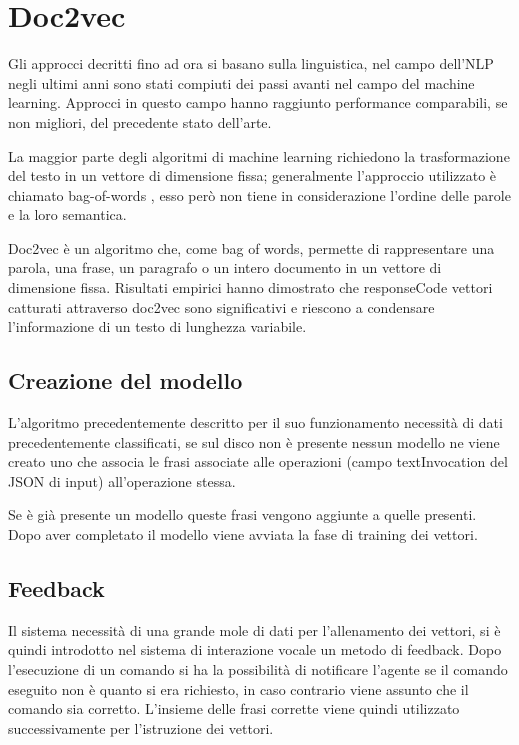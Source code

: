 \documentclass[twoside]{supsistudent}
\begin{document}
\section{Doc2vec}
Gli approcci decritti fino ad ora si basano sulla linguistica, nel campo dell'NLP negli ultimi anni sono stati compiuti dei passi avanti nel campo del machine learning. Approcci in questo campo hanno raggiunto performance comparabili, se non migliori, del precedente stato dell'arte. 

La maggior parte degli algoritmi di machine learning richiedono la trasformazione del testo in un vettore di dimensione fissa; generalmente l'approccio utilizzato è chiamato bag-of-words , esso però non tiene in considerazione l'ordine delle parole e la loro semantica.\cite{bow}

Doc2vec è un algoritmo che, come bag of words, permette di  rappresentare una parola, una frase, un paragrafo o un intero documento in un vettore di dimensione fissa. Risultati empirici hanno dimostrato che responseCode vettori catturati attraverso doc2vec sono significativi e riescono a condensare l'informazione di un testo di lunghezza variabile.\cite{doc2vec}
\subsection{Creazione del modello}
L'algoritmo precedentemente descritto per il suo funzionamento necessità di dati precedentemente classificati, se sul disco non è presente nessun modello ne viene creato uno che associa le frasi associate alle operazioni (campo textInvocation del JSON di input) all'operazione stessa. 

Se è già presente un modello queste frasi vengono aggiunte a quelle presenti. Dopo aver completato il modello viene avviata la fase di training dei vettori.
\subsection{Feedback}
Il sistema necessità di una grande mole di dati per l'allenamento dei vettori, si è quindi introdotto nel sistema di interazione vocale un metodo di feedback. Dopo l'esecuzione di un comando si ha la possibilità di notificare l'agente se il comando eseguito non è quanto si era richiesto, in caso contrario viene assunto che il comando sia corretto. L'insieme delle frasi corrette viene quindi utilizzato successivamente per l'istruzione dei vettori.
\end{document}
